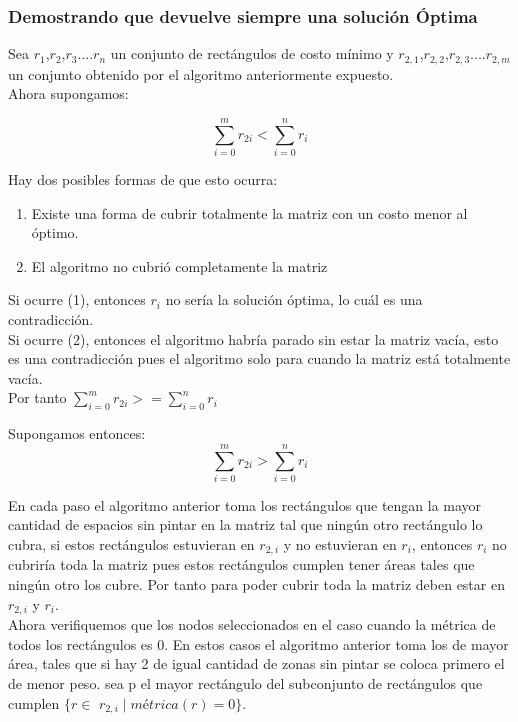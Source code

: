\documentclass{article}
\begin{document}
    \subsubsection{Demostrando que devuelve siempre una solución Óptima}
 
    Sea {$r_1$,$r_2$,$r_3$....$r_n$} un conjunto de rectángulos de costo mínimo y {$r_{2,1}$,$r_{2,2}$,$r_{2,3}$....$r_{2,m}$} un conjunto obtenido por el algoritmo anteriormente expuesto.\\

    Ahora supongamos:

    \begin{equation}
\sum_{i=0}^{m} r_{2i} < \sum_{i=0}^{n} r_{i}
\end{equation}

Hay dos posibles formas de que esto ocurra:

\begin{enumerate}
    \item Existe una forma de cubrir totalmente la matriz con un costo menor al óptimo.
    \item El algoritmo no cubrió completamente la matriz 
\end{enumerate}

    Si ocurre (1), entonces $r_i$ no sería la solución óptima, lo cuál es una contradicción.\\

    Si ocurre (2), entonces el algoritmo habría parado sin estar la matriz vacía, esto es una contradicción pues el algoritmo solo para cuando la matriz está totalmente vacía.\\

    Por tanto $\sum_{i=0}^{m} r_{2i} >= \sum_{i=0}^{n} r_{i}$


    Supongamos entonces:
 \begin{equation}
\sum_{i=0}^{m} r_{2i} > \sum_{i=0}^{n} r_{i}
\end{equation}

En cada paso el algoritmo anterior toma los rectángulos que tengan la mayor cantidad de espacios sin pintar en la matriz tal que ningún otro rectángulo lo cubra, si estos rectángulos estuvieran en $r_{2,i}$ y no estuvieran en $r_i$, entonces $r_i$ no cubriría toda la matriz pues estos rectángulos cumplen tener áreas tales que ningún otro los cubre. Por tanto para poder cubrir toda la matriz deben estar en $r_{2,i}$ y $r_i$.\\

Ahora verifiquemos que los nodos seleccionados en el caso cuando la métrica de todos los rectángulos es 0. En estos casos el algoritmo anterior toma los de mayor área, tales que si hay 2 de igual cantidad de zonas sin pintar se coloca primero el de menor peso. sea p el mayor rectángulo del subconjunto de rectángulos que cumplen $\{ r \in$ $r_{2,i} \mid métrica(r)=0 \}$.\\
\end{document}
